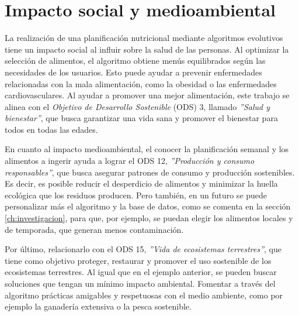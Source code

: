 \chapter{Impacto social y medioambiental}
\label{ch:impacto-social-medioambiental}

La realización de una planificación nutricional mediante algoritmos evolutivos tiene un impacto social al influir sobre la salud de las personas. Al optimizar la selección de alimentos, el algoritmo obtiene menús equilibrados según las necesidades de los usuarios. Esto puede ayudar a prevenir enfermedades relacionadas con la mala alimentación, como la obesidad o las enfermedades cardiovasculares. Al ayudar a promover una mejor alimentación, este trabajo se alinea con el \textit{Objetivo de Desarrollo Sostenible} (ODS) 3, llamado \textit{''Salud y bienestar''}, que busca garantizar una vida sana y promover el bienestar para todos en todas las edades.

En cuanto al impacto medioambiental, el conocer la planificación semanal y los alimentos a ingerir ayuda a lograr el ODS 12, \textit{''Producción y consumo responsables''}, que busca asegurar patrones de consumo y producción sostenibles. Es decir, es posible reducir el desperdicio de alimentos y minimizar la huella ecológica que los residuos producen. Pero también, en un futuro se puede personalizar más el algoritmo y la base de datos, como se comenta en la sección \ref{ch:investigacion}, para que, por ejemplo, se puedan elegir los alimentos locales y de temporada, que generan menos contaminación.

Por último, relacionarlo con el ODS 15, \textit{''Vida de ecosistemas terrestres''}, que tiene como objetivo proteger, restaurar y promover el uso sostenible de los ecosistemas terrestres. Al igual que en el ejemplo anterior, se pueden buscar soluciones que tengan un mínimo impacto ambiental. Fomentar a través del algoritmo prácticas amigables y respetuosas con el medio ambiente, como por ejemplo la ganadería extensiva o la pesca sostenible.
